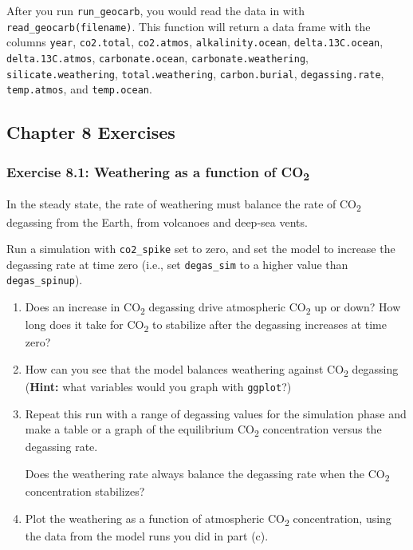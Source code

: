 \documentclass[
]{article}
\begin{document}
After you run \texttt{run\_geocarb}, you would read the data in with
\texttt{read\_geocarb(filename)}. This function will return a data frame
with the columns \texttt{year}, \texttt{co2.total}, \texttt{co2.atmos},
\texttt{alkalinity.ocean}, \texttt{delta.13C.ocean},
\texttt{delta.13C.atmos}, \texttt{carbonate.ocean},
\texttt{carbonate.weathering}, \texttt{silicate.weathering},
\texttt{total.weathering}, \texttt{carbon.burial},
\texttt{degassing.rate}, \texttt{temp.atmos}, and \texttt{temp.ocean}.

\hypertarget{chapter-8-exercises}{%
\subsection{Chapter 8 Exercises}\label{chapter-8-exercises}}

\hypertarget{exercise-8.1-weathering-as-a-function-of-co2}{%
\subsubsection{\texorpdfstring{Exercise 8.1: Weathering as a function of
CO\textsubscript{2}}{Exercise 8.1: Weathering as a function of CO2}}\label{exercise-8.1-weathering-as-a-function-of-co2}}

In the steady state, the rate of weathering must balance the rate of
CO\textsubscript{2} degassing from the Earth, from volcanoes and
deep-sea vents.

Run a simulation with \texttt{co2\_spike} set to zero, and set the model
to increase the degassing rate at time zero (i.e., set
\texttt{degas\_sim} to a higher value than \texttt{degas\_spinup}).

\begin{enumerate}
\def\labelenumi{\alph{enumi})}
\item
  Does an increase in CO\textsubscript{2} degassing drive atmospheric
  CO\textsubscript{2} up or down? How long does it take for
  CO\textsubscript{2} to stabilize after the degassing increases at time
  zero?
\item
  How can you see that the model balances weathering against
  CO\textsubscript{2} degassing (\textbf{Hint:} what variables would you
  graph with \texttt{ggplot}?)
\item
  Repeat this run with a range of degassing values for the simulation
  phase and make a table or a graph of the equilibrium
  CO\textsubscript{2} concentration versus the degassing rate.

  Does the weathering rate always balance the degassing rate when the
  CO\textsubscript{2} concentration stabilizes?
\item
  Plot the weathering as a function of atmospheric CO\textsubscript{2}
  concentration, using the data from the model runs you did in part (c).
\end{enumerate}
\end{document}
